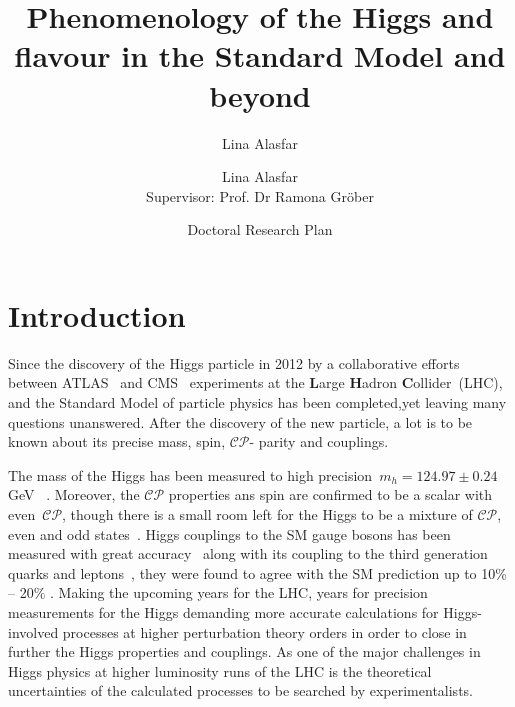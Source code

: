 \documentclass[12pt]{article}
\title{\bf{Phenomenology of the Higgs and flavour in the Standard Model and beyond }}
\author{Lina Alasfar}
\author[2]
{Lina Alasfar \\  Supervisor: Prof. Dr Ramona Gr\"{o}ber}
\date{Doctoral Research Plan}
\newcommand*{\mytextstyle}{\sffamily\Large\bfseries\color{black!85}}
\newcommand{\arcarrow}[3]{%
	\pgfmathsetmacro{\rin}{1.7}
	\pgfmathsetmacro{\rmid}{2.2}
	\pgfmathsetmacro{\rout}{2.7}
	\pgfmathsetmacro{\astart}{#1}
	\pgfmathsetmacro{\aend}{#2}
	\pgfmathsetmacro{\atip}{5}
	\fill[mygray, very thick] (\astart+\atip:\rin)
	arc (\astart+\atip:\aend:\rin)
	-- (\aend-\atip:\rmid)
	-- (\aend:\rout)   arc (\aend:\astart+\atip:\rout)
	-- (\astart:\rmid) -- cycle;
	\path[
	decoration = {
		text along path,
		text = {|\mytextstyle|#3},
		text align = {align = center},
		raise = -1.0ex
	},
	decorate
	](\astart+\atip:\rmid) arc (\astart+\atip:\aend+\atip:\rmid);
}
\begin{document}
\maketitle

\section*{Introduction}
Since the discovery of the Higgs particle in 2012 by a collaborative efforts between ATLAS~\cite{Aad:2012tfa} and CMS~\cite{Chatrchyan:2012xdj} experiments at the {\bf L}arge {\bf H}adron {\bf C}ollider~(LHC), and the Standard Model of particle physics has been completed,yet leaving many questions unanswered. After the discovery of the new particle,  a lot is to be known about  its precise mass, spin, $\mathcal{CP}$- parity and couplings. 
\begin{center}
\end{center}
\par The mass of the Higgs has been measured to high precision~\textcolor{myv}{$ m_h=124.97 \pm 0.24$ GeV\xspace}~\cite{Aaboud:2018wps} . Moreover, the  $\mathcal{CP}$ properties ans spin are confirmed to be a scalar with even~$\mathcal{CP}$, though there is a small room left for the Higgs to be a mixture of $\mathcal{CP}$, even and odd states~\cite{Aad:2015mxa}. Higgs couplings to the SM gauge bosons has been measured with great accuracy~\cite{CMS-PAS-HIG-19-005} along with its coupling to the third generation quarks and leptons~\cite{Sirunyan:2017khh,Sirunyan:2019nlw,CMS-PAS-HIG-19-005},  they were found to agree with the SM prediction up to 10\% -- 20\% \cite{Aad:2019mbh}.  Making the upcoming years for the LHC,  years for precision measurements for the Higgs demanding more accurate calculations for Higgs-involved processes at higher perturbation theory orders in order to close in further the Higgs properties and couplings. As one of the major challenges in Higgs physics at higher luminosity runs of the LHC is the theoretical uncertainties of the calculated processes to be searched by experimentalists. \\
\end{document}
